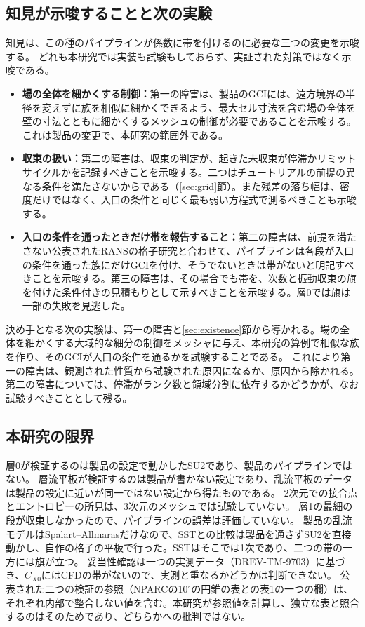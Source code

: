 \documentclass[twocolumn]{labreport}
\newcommand{\CXzero}{C_{X0}}
\begin{document}
\subsection{知見が示唆することと次の実験}
\label{sec:implications}

知見は、この種のパイプラインが係数に帯を付けるのに必要な三つの変更を示唆する。
どれも本研究では実装も試験もしておらず、実証された対策ではなく示唆である。
\begin{itemize}
\item \textbf{場の全体を細かくする制御：}第一の障害は、製品のGCIには、遠方境界の半径を変えずに族を相似に細かくできるよう、最大セル寸法を含む場の全体を壁の寸法とともに細かくするメッシュの制御が必要であることを示唆する。
これは製品の変更で、本研究の範囲外である。
\item \textbf{収束の扱い：}第二の障害は、収束の判定が、起きた未収束が停滞かリミットサイクルかを記録すべきことを示唆する。二つはチュートリアルの前提の異なる条件を満たさないからである（\ref{sec:grid}節）。また残差の落ち幅は、密度だけではなく、入口の条件と同じく最も弱い方程式で測るべきことも示唆する。
\item \textbf{入口の条件を通ったときだけ帯を報告すること：}第二の障害は、前提を満たさない公表されたRANSの格子研究と合わせて、パイプラインは各段が入口の条件を通った族にだけGCIを付け、そうでないときは帯がないと明記すべきことを示唆する。第三の障害は、その場合でも帯を、次数と振動収束の旗を付けた条件付きの見積もりとして示すべきことを示唆する。層0では旗は一部の失敗を見逃した。
\end{itemize}
決め手となる次の実験は、第一の障害と\ref{sec:existence}節から導かれる。場の全体を細かくする大域的な細分の制御をメッシャに与え、本研究の算例で相似な族を作り、そのGCIが入口の条件を通るかを試験することである。
これにより第一の障害は、観測された性質から試験された原因になるか、原因から除かれる。第二の障害については、停滞がランク数と領域分割に依存するかどうかが、なお試験すべきこととして残る。

\subsection{本研究の限界}
\label{sec:limits}

層0が検証するのは製品の設定で動かしたSU2であり、製品のパイプラインではない。
層流平板が検証するのは製品が書かない設定であり、乱流平板のデータは製品の設定に近いが同一ではない設定から得たものである。
2次元での接合点とエントロピーの所見は、3次元のメッシュでは試験していない。
層1の最細の段が収束しなかったので、パイプラインの誤差は評価していない。
製品の乱流モデルはSpalart--Allmarasだけなので、SSTとの比較は製品を通さずSU2を直接動かし、自作の格子の平板で行った。SSTはそこでは1次であり、二つの帯の一方には旗が立つ。
妥当性確認は一つの実測データ（DREV-TM-9703）に基づき、$\CXzero$にはCFDの帯がないので、実測と重なるかどうかは判断できない。
公表された二つの検証の参照（NPARCの10$^\circ$の円錐の表と\citet{celik2008}の表1の一つの欄）は、それぞれ内部で整合しない値を含む。本研究が参照値を計算し、独立な表と照合するのはそのためであり、どちらかへの批判ではない。
\end{document}
